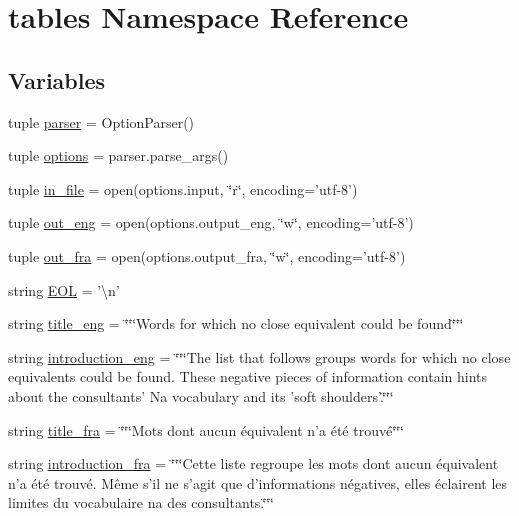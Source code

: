 \hypertarget{namespacetables}{\section{tables Namespace Reference}
\label{namespacetables}
}
\subsection*{Variables}
\begin{DoxyCompactItemize}
\item 
tuple \hyperlink{namespacetables_aab6cde738d50479c3c5e30496abe9b1f}{parser} = Option\+Parser()
\item 
tuple \hyperlink{namespacetables_a2afda4842d5e225c323bccb8a6acd91e}{options} = parser.\+parse\+\_\+args()
\item 
tuple \hyperlink{namespacetables_a1975763f19d6c9aef3a5b7becaf1084f}{in\+\_\+file} = open(options.\+input, \char`\"{}r\char`\"{}, encoding='utf-\/8')
\item 
tuple \hyperlink{namespacetables_afe00514807dd9e76c7ff40483db626f6}{out\+\_\+eng} = open(options.\+output\+\_\+eng, \char`\"{}w\char`\"{}, encoding='utf-\/8')
\item 
tuple \hyperlink{namespacetables_ad2465fc8e1cdec591a177bed2fdde2d7}{out\+\_\+fra} = open(options.\+output\+\_\+fra, \char`\"{}w\char`\"{}, encoding='utf-\/8')
\item 
string \hyperlink{namespacetables_a6821e34021c9b7b076d5e9df10a2b64a}{E\+O\+L} = '\textbackslash{}n'
\item 
string \hyperlink{namespacetables_ad441c656fe4d99ca32f027870b0eb314}{title\+\_\+eng} = \char`\"{}\char`\"{}\char`\"{}Words for which no close equivalent could be found\char`\"{}\char`\"{}\char`\"{}
\item 
string \hyperlink{namespacetables_afb2322668f3f126cd578ae1d25c07957}{introduction\+\_\+eng} = \char`\"{}\char`\"{}\char`\"{}The list that follows groups words for which no close equivalents could be found. These negative pieces of information contain hints about the consultants' Na vocabulary and its 'soft shoulders'.\char`\"{}\char`\"{}\char`\"{}
\item 
string \hyperlink{namespacetables_a0aadda1a5ce9f5d273022f631a8a28da}{title\+\_\+fra} = \char`\"{}\char`\"{}\char`\"{}Mots dont aucun équivalent n'a été trouvé\char`\"{}\char`\"{}\char`\"{}
\item 
string \hyperlink{namespacetables_a26cd4412ae8563a5ee426d893f55bfd5}{introduction\+\_\+fra} = \char`\"{}\char`\"{}\char`\"{}Cette liste regroupe les mots dont aucun équivalent n'a été trouvé. Même s'il ne s'agit que d'informations négatives, elles éclairent les limites du vocabulaire na des consultants.\char`\"{}\char`\"{}\char`\"{}

\end{DoxyCompactItemize}
